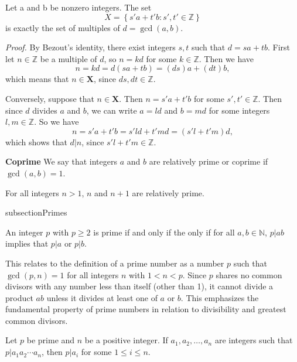 \documentclass{tufte-handout}
\begin{document}
\begin{Proposition}
    Let a and b be nonzero integers. The set
    \[X = \left\{s'a+t'b:s',t'\in \mathbb{Z}\right\}\]
    is exactly the set of multiples of $ d = \gcd(a,b) $.
\end{Proposition}
\textit{Proof.} By Bezout's identity, there exist integers $ s,t $ such that \( d = sa+tb \).
First let \( n \in \mathbb{Z} \) be a multiple of \( d \), so \( n = kd \) for some \( k \in \mathbb{Z} \).
Then we have \[n=kd=d(sa+tb)=(ds)a+(dt)b,\]
which means that \( n\in \mathbf{X} \), since \( ds,dt \in \mathbb{Z} \).

Conversely, suppose that \( n \in \mathbf{X} \). Then \( n = s'a+t'b \) for some \( s',t' \in \mathbb{Z} \).
Then since \( d \) divides \( a \) and \( b \), we can write \( a=ld \) and \( b=md \) for some integers \( l,m \in \mathbb{Z}\).
So we have \[n=s'a+t'b=s'ld+t'md=(s'l+t'm)d,\]
which shows that \( d|n \), since \( s'l+t'm \in \mathbb{Z} \). \qedsymbol

\textbf{Coprime} We say that integers \( a \) and \( b \) are relatively prime or coprime if \( \gcd(a,b) = 1 \).

\begin{Proposition}
    For all integers \( n>1 \), \( n \) and \( n+1 \) are relatively prime.
\end{Proposition}

subsection{Primes}
\begin{Theorem}
    An integer \( p \) with \( p\geq 2 \) is prime if and only if the only if for
    all \( a,b \in \mathbb{N} \), \( p|ab \) implies that \( p|a \) or \( p|b \).
\end{Theorem}

This relates to the definition of a prime number as a number \( p \) such that \( \gcd(p, n) = 1 \) for
 all integers \( n \) with \( 1 < n < p \). 
 Since \( p \) shares no common divisors with any number less than 
 itself (other than 1), it cannot divide a product \( ab \) unless 
 it divides at least one of \( a \) or \( b \). 
 This emphasizes the fundamental property of prime numbers in relation to 
 divisibility and greatest common divisors.

\begin{Corollary}
    Let \( p \) be prime and \( n \) be a positive integer. If \( a_1, a_2, \ldots,a_n \) are
    integers such that \( p|a_1a_2\cdots a_n \), then \( p|a_i \) for some \( 1\leq i \leq n \).
\end{Corollary}
\end{document}
